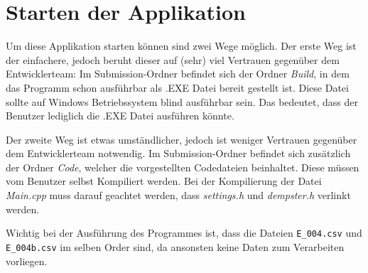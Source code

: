 \chapter{Starten der Applikation}
Um diese Applikation starten können sind zwei Wege möglich. 
Der erste Weg ist der einfachere, jedoch beruht dieser auf (sehr) viel Vertrauen gegenüber dem Entwicklerteam: Im Submission-Ordner befindet sich der Ordner \textit{Build}, in dem das Programm schon ausführbar als .EXE Datei bereit gestellt ist. Diese Datei sollte auf Windows Betriebssystem blind ausführbar sein. Das bedeutet, dass der Benutzer lediglich die .EXE Datei ausführen könnte.

Der zweite Weg ist etwas umständlicher, jedoch ist weniger Vertrauen gegenüber dem Entwicklerteam notwendig. Im Submission-Ordner befindet sich zusätzlich der Ordner \textit{Code}, welcher die vorgestellten Codedateien beinhaltet. Diese müssen vom Benutzer selbst Kompiliert werden. Bei der Kompilierung der Datei \textit{Main.cpp} muss darauf geachtet werden, dass \textit{settings.h} und \textit{dempster.h} verlinkt werden.


Wichtig bei der Ausführung des Programmes ist, dass die Dateien \verb|E_004.csv| und \verb|E_004b.csv| im selben Order sind, da ansonsten keine Daten zum Verarbeiten vorliegen.  